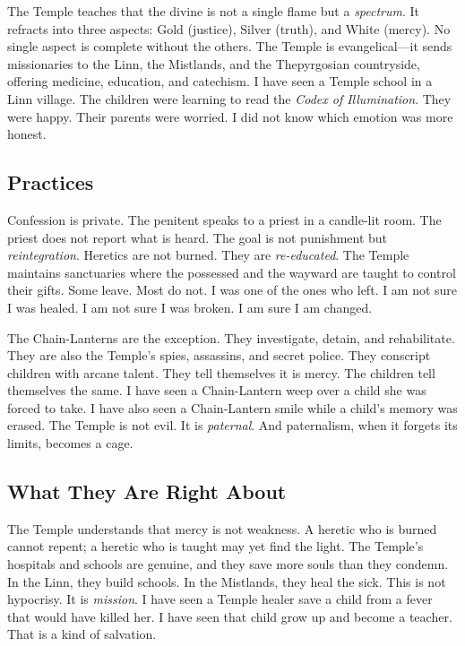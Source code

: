 \documentclass{book}
\begin{document}
The Temple teaches that the divine is not a single flame but a \textit{spectrum}. It refracts into three aspects: Gold (justice), Silver (truth), and White (mercy). No single aspect is complete without the others. The Temple is evangelical---it sends missionaries to the Linn, the Mistlands, and the Thepyrgosian countryside, offering medicine, education, and catechism. I have seen a Temple school in a Linn village. The children were learning to read the \textit{Codex of Illumination}. They were happy. Their parents were worried. I did not know which emotion was more honest.

\subsection{Practices}

Confession is private. The penitent speaks to a priest in a candle-lit room. The priest does not report what is heard. The goal is not punishment but \textit{reintegration}. Heretics are not burned. They are \textit{re-educated}. The Temple maintains sanctuaries where the possessed and the wayward are taught to control their gifts. Some leave. Most do not. I was one of the ones who left. I am not sure I was healed. I am not sure I was broken. I am sure I am changed.

The Chain-Lanterns are the exception. They investigate, detain, and rehabilitate. They are also the Temple's spies, assassins, and secret police. They conscript children with arcane talent. They tell themselves it is mercy. The children tell themselves the same. I have seen a Chain-Lantern weep over a child she was forced to take. I have also seen a Chain-Lantern smile while a child's memory was erased. The Temple is not evil. It is \textit{paternal}. And paternalism, when it forgets its limits, becomes a cage.

\subsection{What They Are Right About}

The Temple understands that mercy is not weakness. A heretic who is burned cannot repent; a heretic who is taught may yet find the light. The Temple's hospitals and schools are genuine, and they save more souls than they condemn. In the Linn, they build schools. In the Mistlands, they heal the sick. This is not hypocrisy. It is \textit{mission}. I have seen a Temple healer save a child from a fever that would have killed her. I have seen that child grow up and become a teacher. That is a kind of salvation.
\end{document}
